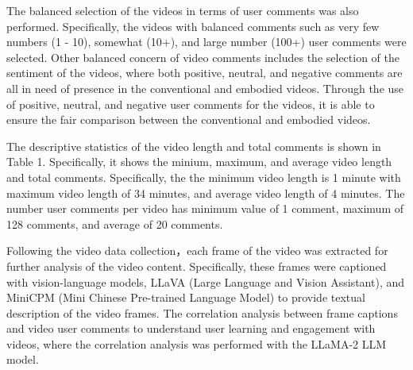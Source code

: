 \documentclass[12pt]{article}
\begin{document}
The balanced selection of the videos in terms of user comments was also performed. Specifically, the videos with balanced comments such as very few numbers (1 - 10), somewhat (10+), and large number (100+) user comments were selected. Other balanced concern of video comments includes the selection of the sentiment of the videos, where both positive, neutral, and negative comments are all in need of presence in the conventional and embodied videos. Through the use of positive, neutral, and negative user comments for the videos, it is able to ensure the fair comparison between the conventional and embodied videos.          


The descriptive statistics of the video length and total comments is shown in Table 1. Specifically, it shows the minium, maximum, and average video length and total comments. Specifically, the the minimum video length is 1 minute with maximum video length of 34 minutes, and average video length of  4 minutes. The number user comments per video has minimum value of 1 comment, maximum of 128 comments, and average of 20 comments.       





Following the video data collection，each frame of the video was extracted for further analysis of the video content. Specifically, these frames were captioned with vision-language models, LLaVA (Large Language and Vision Assistant), and MiniCPM (Mini Chinese Pre-trained Language Model) to provide textual description of the video frames. The correlation analysis between frame captions and video user comments to understand user learning and engagement with videos, where the correlation analysis was performed with the LLaMA-2 LLM model. %





\end{document}
